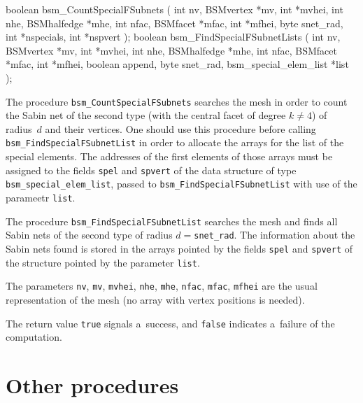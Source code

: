 \medskip
\begin{listingC}
boolean bsm_CountSpecialFSubnets ( int nv, BSMvertex *mv, int *mvhei,
                                   int nhe, BSMhalfedge *mhe,
                                   int nfac, BSMfacet *mfac, int *mfhei,
                                   byte snet_rad,
                                   int *nspecials, int *nspvert );
boolean bsm_FindSpecialFSubnetLists (
                                int nv, BSMvertex *mv, int *mvhei,
                                int nhe, BSMhalfedge *mhe,
                                int nfac, BSMfacet *mfac, int *mfhei,
                                boolean append,
                                byte snet_rad, 
                                bsm_special_elem_list *list );
\end{listingC}
The procedure \texttt{bsm\_CountSpecialFSubnets} searches the mesh in order
to count the Sabin net of the second type (with the central facet of degree
$k\neq 4$) of radius~$d$ and their vertices. One should use this procedure
before calling \texttt{bsm\_FindSpecialFSubnetList} in order to allocate the
arrays for the list of the special elements. The addresses of the first
elements of those arrays must be assigned to the fields \texttt{spel} and
\texttt{spvert} of the data structure of type
\texttt{bsm\_special\_elem\_list}, passed to
\texttt{bsm\_FindSpecialFSubnetList} with use of the parameetr
\texttt{list}.

The procedure \texttt{bsm\_FindSpecialFSubnetList} searches the mesh and
finds all Sabin nets of the second type of radius $d=$\texttt{snet\_rad}.
The information about
the Sabin nets found is stored in the arrays pointed by the fields
\texttt{spel} and \texttt{spvert} of the structure pointed by the parameter
\texttt{list}.

The parameters \texttt{nv}, \texttt{mv}, \texttt{mvhei}, \texttt{nhe},
\texttt{mhe}, \texttt{nfac}, \texttt{mfac}, \texttt{mfhei} are the usual
representation of the mesh (no array with vertex positions is needed).

The return value \texttt{true} signals a~success, and \texttt{false}
indicates a~failure of the computation.


\section{Other procedures}

